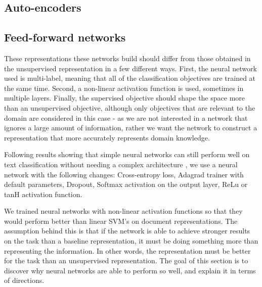 


\subsection{Auto-encoders}


\subsection{Feed-forward networks}

These representations these networks build should differ from those obtained in the unsupervised representation in a few different ways. First, the neural network used is multi-label, meaning that all of the classification objectives are trained at the same time. Second, a non-linear activation function is used, sometimes in multiple layers. Finally, the supervised objective should shape the space more than an unsupervised objective, although only objectives that are relevant to the domain are considered in this case - as we are not interested in a network that ignores a large amount of information, rather we want the network to construct a representation that more accurately represents domain knowledge.

 Following results showing that simple neural networks can still perform well on text classification without needing a complex architecture  \cite{Lakhotia2018} \cite{Nam2014}, we use a neural network with the following changes: Cross-entropy loss, Adagrad trainer with default parameters, Dropout, Softmax activation on the output layer, ReLu or tanH activation function. 

We trained neural networks with non-linear activation functions so that they would  perform better than linear SVM's on  document representations. The assumption behind this is that if the network is able to achieve stronger results on the task than a baseline representation, it must be doing something more than representing the information. In other words, the representation must be better for the task than an unsupervised representation. The goal of this section is to discover why neural networks are able to perform so well, and explain it in terms of directions. 


